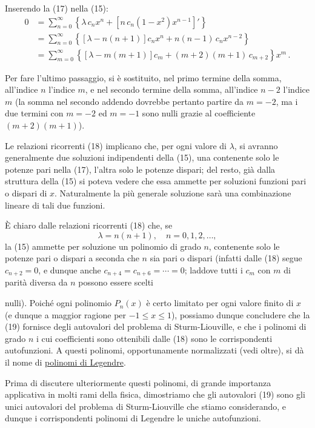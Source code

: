 \documentclass[11pt, a4paper]{book}
\numberwithin{equation}{section}
\begin{document}
Inserendo la (17) nella (15):
\begin{align*}
0 &= \sum_{n=0}^{\infty} \left\{ \lambda\, c_n x^n + \left[n\, c_n (1-x^2) x^{n-1}\right]' \right\} \\
&= \sum_{n=0}^{\infty} \left\{ \left[\lambda - n(n+1)\right] c_n x^n + n(n-1)\, c_n x^{n-2} \right\} \\
&= \sum_{m=0}^{\infty} \left\{ \left[\lambda - m(m+1)\right] c_m + (m+2)(m+1)\, c_{m+2} \right\} x^m \,.
\end{align*}

Per fare l'ultimo passaggio, si è sostituito, nel primo termine della somma, all'indice $n$ l'indice $m$,
e nel secondo termine della somma, all'indice $n-2$ l'indice $m$ (la somma nel secondo addendo dovrebbe pertanto partire da $m = -2$, ma i due termini con $m=-2$ ed $m=-1$ sono nulli grazie al coefficiente $(m+2)(m+1)$).

Le relazioni ricorrenti (18) implicano che, per ogni valore di $\lambda$,
si avranno generalmente due soluzioni indipendenti della (15), una contenente
solo le potenze pari nella (17), l'altra solo le potenze dispari; del
resto, già dalla struttura della (15) si poteva vedere che essa ammette
per soluzioni funzioni pari o dispari di $x$. Naturalmente la più generale
soluzione sarà una combinazione lineare di tali due funzioni.

È chiaro dalle relazioni ricorrenti (18) che, se
\begin{equation}
\lambda = n(n+1), \quad n = 0,1,2,\ldots, \tag{19}
\end{equation}
la (15) ammette per soluzione un polinomio di grado $n$, contenente solo
le potenze pari o dispari a seconda che $n$ sia pari o dispari (infatti dalle
(18) segue $c_{n+2} = 0$, e dunque anche $c_{n+4} = c_{n+6} = \cdots = 0$;
laddove tutti i $c_m$ con $m$ di parità diversa da $n$ possono essere scelti


nulli). Poiché ogni polinomio $P_n(x)$ è certo limitato per ogni
valore finito di $x$ (e dunque a maggior ragione per $-1 \leq x \leq 1$),
possiamo dunque concludere che la (19) fornisce degli autovalori del
problema di Sturm-Liouville, e che i polinomi di grado $n$ i cui coefficienti
sono ottenibili dalle (18) sono le corrispondenti autofunzioni. A
questi polinomi, opportunamente normalizzati (vedi oltre), si dà il
nome di \uline{polinomi di Legendre}.

Prima di discutere ulteriormente questi polinomi, di grande
importanza applicativa in molti rami della fisica, dimostriamo che gli
autovalori (19) sono gli unici autovalori del problema di Sturm-Liouville
che stiamo considerando, e dunque i corrispondenti polinomi di Legendre
le uniche autofunzioni.
\end{document}
